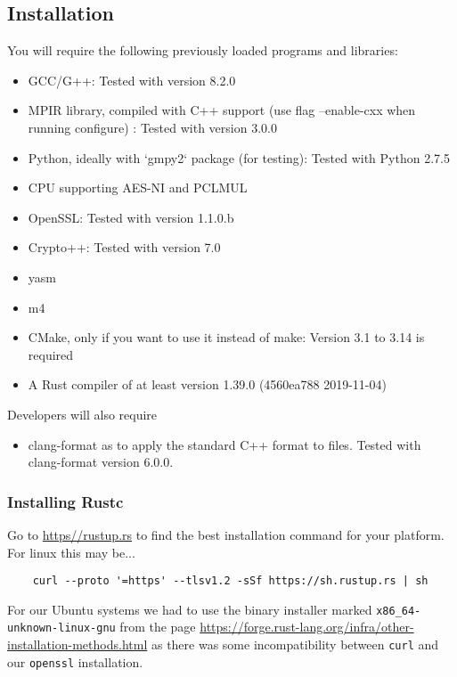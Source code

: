
\subsection{Installation}
You will require the following previously loaded programs and
libraries:
\begin{itemize}
\item GCC/G++: Tested with version 8.2.0
\item MPIR library, compiled with C++ support (use flag --enable-cxx when running configure) : Tested with version 3.0.0
\item Python, ideally with `gmpy2` package (for testing): Tested with Python 2.7.5
\item CPU supporting AES-NI and PCLMUL
\item OpenSSL: Tested with version 1.1.0.b
\item Crypto++: Tested with version 7.0
\item yasm
\item m4
\item CMake, only if you want to use it instead of make: Version 3.1 to 3.14 is required
\item A Rust compiler of at least version 1.39.0 (4560ea788 2019-11-04)
\end{itemize}
Developers will also require
\begin{itemize}
\item clang-format as to apply the standard C++ format to files. Tested with clang-format version 6.0.0.
\end{itemize}

\subsubsection{Installing Rustc}

Go to \url{https//rustup.rs} to find the best installation command for your platform.
For linux this may be...
\begin{verbatim}
    curl --proto '=https' --tlsv1.2 -sSf https://sh.rustup.rs | sh
\end{verbatim}
For our Ubuntu systems we had to use the binary installer marked
\verb+x86_64-unknown-linux-gnu+ from the page
\url{https://forge.rust-lang.org/infra/other-installation-methods.html}
as there was some incompatibility between \verb+curl+ and our
\verb+openssl+ installation.

